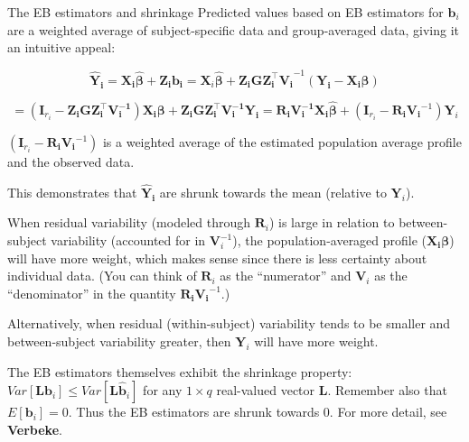 \documentclass[
  9pt,
  ignorenonframetext,
]{beamer}
\begin{document}
\begin{frame}{The EB estimators and shrinkage}
\protect\hypertarget{the-eb-estimators-and-shrinkage}{}
Predicted values based on EB estimators for \(\pmb b_i\) are a weighted
average of subject-specific data and group-averaged data, giving it an
intuitive appeal:

\[
\pmb {\hat Y_i} = \pmb {X_i  \hat \beta} + \pmb {Z_i b_i}   = \pmb X_i \pmb {\hat \beta} + \pmb {Z_i GZ_i^{\top}V_i}^{-1} (\pmb {Y_i-X_i \beta})    
\]

\vspace{-5mm}

\[
= (\pmb I_{r_i}- \pmb {Z_i GZ_i^{\top} V_i^{-1}}) \pmb {X_i  \beta} + \pmb {Z_i GZ_i^{\top}V_i^{-1} Y_i} = \pmb {R_i V_i^{-1} X_i  \hat \beta} + (\pmb I_{r_i} - \pmb {R_i V_i}^{-1}) \pmb Y_i
\]

\((\pmb I_{r_i} - \pmb {R_i V_i}^{-1})\) is a weighted average of the
estimated population average profile and the observed data.

This demonstrates that \(\pmb {\hat Y_i}\) are shrunk towards the mean
(relative to \(\pmb Y_i\)).
\end{frame}

\begin{frame}{}
\protect\hypertarget{section-3}{}
When residual variability (modeled through \(\pmb R_i\)) is large in
relation to between-subject variability (accounted for in
\(\pmb V_i^{-1}\)), the population-averaged profile
(\(\pmb {X_i \beta}\)) will have more weight, which makes sense since
there is less certainty about individual data. (You can think of
\(\pmb R_i\) as the ``numerator'' and \(\pmb V_i\) as the
``denominator'' in the quantity \(\pmb {R_i V_i}^{-1}\).)

Alternatively, when residual (within-subject) variability tends to be
smaller and between-subject variability greater, then \(\pmb Y_i\) will
have more weight.

The EB estimators themselves exhibit the shrinkage property:
\(Var[\pmb {Lb}_i] \leq Var[\pmb {L\hat b}_i]\) for any \(1 \times q\)
real-valued vector \(\pmb L\). Remember also that \(E[\pmb b_i] = 0\).
Thus the EB estimators are shrunk towards 0. For more detail, see
\textbf{Verbeke}.
\end{frame}
\end{document}
